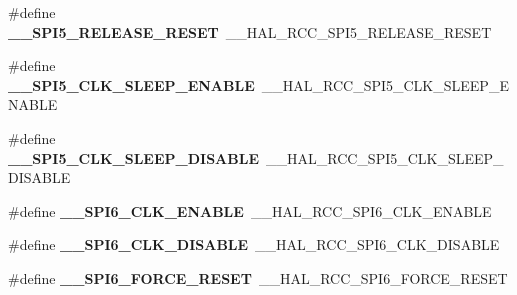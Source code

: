 \begin{DoxyCompactItemize}
\item 
\hypertarget{group___h_a_l___r_c_c___aliased_gabca42c543de06ceaad91178e82cc33de}{\#define {\bfseries \-\_\-\-\_\-\-S\-P\-I5\-\_\-\-R\-E\-L\-E\-A\-S\-E\-\_\-\-R\-E\-S\-E\-T}~\-\_\-\-\_\-\-H\-A\-L\-\_\-\-R\-C\-C\-\_\-\-S\-P\-I5\-\_\-\-R\-E\-L\-E\-A\-S\-E\-\_\-\-R\-E\-S\-E\-T}\label{group___h_a_l___r_c_c___aliased_gabca42c543de06ceaad91178e82cc33de}

\item 
\hypertarget{group___h_a_l___r_c_c___aliased_gabbaf71d9b0e2f5d88c3563747d53fc4b}{\#define {\bfseries \-\_\-\-\_\-\-S\-P\-I5\-\_\-\-C\-L\-K\-\_\-\-S\-L\-E\-E\-P\-\_\-\-E\-N\-A\-B\-L\-E}~\-\_\-\-\_\-\-H\-A\-L\-\_\-\-R\-C\-C\-\_\-\-S\-P\-I5\-\_\-\-C\-L\-K\-\_\-\-S\-L\-E\-E\-P\-\_\-\-E\-N\-A\-B\-L\-E}\label{group___h_a_l___r_c_c___aliased_gabbaf71d9b0e2f5d88c3563747d53fc4b}

\item 
\hypertarget{group___h_a_l___r_c_c___aliased_ga8ad5af0156ecf5b7fb04992a241103ed}{\#define {\bfseries \-\_\-\-\_\-\-S\-P\-I5\-\_\-\-C\-L\-K\-\_\-\-S\-L\-E\-E\-P\-\_\-\-D\-I\-S\-A\-B\-L\-E}~\-\_\-\-\_\-\-H\-A\-L\-\_\-\-R\-C\-C\-\_\-\-S\-P\-I5\-\_\-\-C\-L\-K\-\_\-\-S\-L\-E\-E\-P\-\_\-\-D\-I\-S\-A\-B\-L\-E}\label{group___h_a_l___r_c_c___aliased_ga8ad5af0156ecf5b7fb04992a241103ed}

\item 
\hypertarget{group___h_a_l___r_c_c___aliased_gaeaff69ae659f6a4c17e27b80ef8a80bc}{\#define {\bfseries \-\_\-\-\_\-\-S\-P\-I6\-\_\-\-C\-L\-K\-\_\-\-E\-N\-A\-B\-L\-E}~\-\_\-\-\_\-\-H\-A\-L\-\_\-\-R\-C\-C\-\_\-\-S\-P\-I6\-\_\-\-C\-L\-K\-\_\-\-E\-N\-A\-B\-L\-E}\label{group___h_a_l___r_c_c___aliased_gaeaff69ae659f6a4c17e27b80ef8a80bc}

\item 
\hypertarget{group___h_a_l___r_c_c___aliased_ga52970a8cdb4096533a1ca3221f3464d9}{\#define {\bfseries \-\_\-\-\_\-\-S\-P\-I6\-\_\-\-C\-L\-K\-\_\-\-D\-I\-S\-A\-B\-L\-E}~\-\_\-\-\_\-\-H\-A\-L\-\_\-\-R\-C\-C\-\_\-\-S\-P\-I6\-\_\-\-C\-L\-K\-\_\-\-D\-I\-S\-A\-B\-L\-E}\label{group___h_a_l___r_c_c___aliased_ga52970a8cdb4096533a1ca3221f3464d9}

\item 
\hypertarget{group___h_a_l___r_c_c___aliased_ga949e3288b4d1c612cd52f79baa120bcd}{\#define {\bfseries \-\_\-\-\_\-\-S\-P\-I6\-\_\-\-F\-O\-R\-C\-E\-\_\-\-R\-E\-S\-E\-T}~\-\_\-\-\_\-\-H\-A\-L\-\_\-\-R\-C\-C\-\_\-\-S\-P\-I6\-\_\-\-F\-O\-R\-C\-E\-\_\-\-R\-E\-S\-E\-T}\label{group___h_a_l___r_c_c___aliased_ga949e3288b4d1c612cd52f79baa120bcd}


\end{DoxyCompactItemize}
